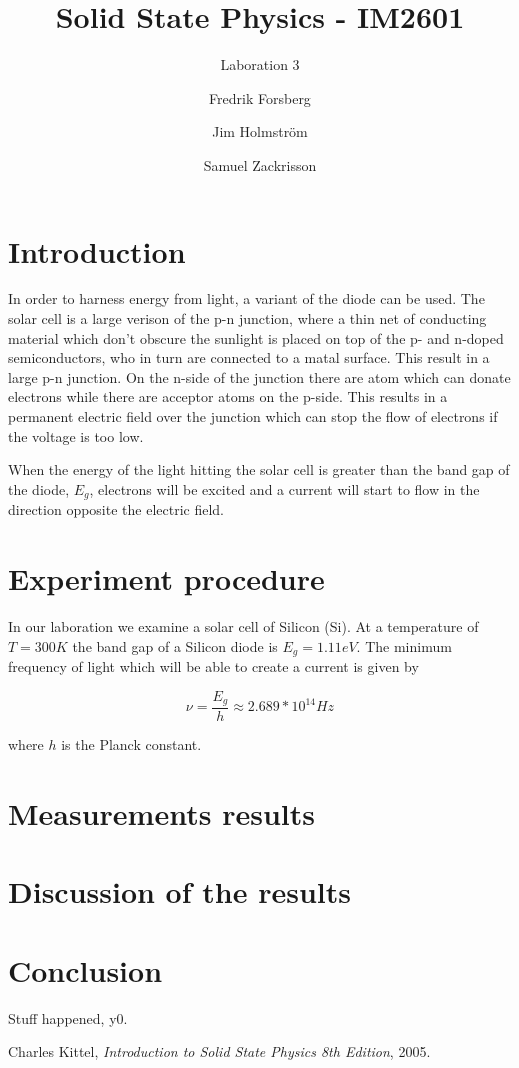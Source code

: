 \documentclass[a4paper,twoside=false,abstract=false,numbers=noenddot,
titlepage=false,headings=small,parskip=half,version=last]{scrartcl}
\title{Solid State Physics - IM2601}
\subtitle{Laboration 3}
\author[1]{Fredrik Forsberg}
\author[1]{Jim Holmström}
\author[1]{Samuel Zackrisson}
\affil[1]{Engineering Physics, Royal Institute of Technology}
\affil[1]{\{fforsber, jimho, samuelz\}@kth.se}
\begin{document}
\maketitle
\thispagestyle{empty}

\section{Introduction}
In order to harness energy from light, a variant of the diode can be used. The solar cell is a large verison of the p-n junction, where a thin net of conducting material which don't obscure the sunlight is placed on top of the p- and n-doped semiconductors, who in turn are connected to a matal surface. This result in a large p-n junction. On the n-side of the junction there are atom which can donate electrons while there are acceptor atoms on the p-side. This results in a permanent electric field over the junction which can stop the flow of electrons if the voltage is too low.

When the energy of the light hitting the solar cell is greater than the band gap of the diode, $E_g$, electrons will be excited and a current will start to flow in the direction opposite the electric field.

\section{Experiment procedure}
In our laboration we examine a solar cell of Silicon (Si). At a temperature of $T = 300 K$ the band gap of a Silicon diode is $E_g=1.11 eV$. The minimum frequency of light which will be able to create a current is given by

$$\nu = \frac{E_g}{h} \approx 2.689*10^{14} Hz$$

where $h$ is the Planck constant.



\section{Measurements results}

\section{Discussion of the results}

\section{Conclusion}
Stuff happened, y0.

\begin{thebibliography}{1}
        Charles Kittel,
        {\em Introduction to Solid State Physics 8th Edition},
        2005.
\end{thebibliography}
\end{document}
